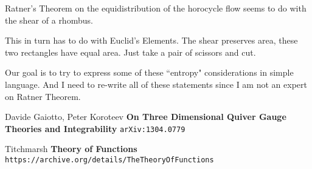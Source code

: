 \documentclass[12pt]{article}
\begin{document}
\noindent Ratner's Theorem on the equidistribution of the horocycle flow seems to do with the shear of a rhombus.
\newline



This in turn has to do with Euclid's Elements.  The shear preserves area, these two rectangles have equal area.  Just take a pair of scissors and cut.

\newpage

\noindent Our goal is to try to express some of these ``entropy" considerations in simple language.  And I need to re-write all of these statements since I am not an expert on Ratner Theorem.


\selectfont \fontsize{12}{10}\selectfont

\begin{thebibliography}{}

\item Davide Gaiotto, Peter Koroteev \textbf{On Three Dimensional Quiver Gauge Theories and Integrability} \texttt{arXiv:1304.0779}

\item Titchmarsh \textbf{Theory of Functions} \texttt{https://archive.org/details/TheTheoryOfFunctions}



\end{thebibliography}
\end{document}
